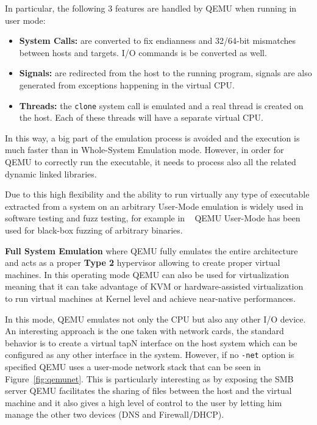 In particular, the following 3 features are handled by QEMU when running in user mode:

\begin{itemize}
    \item \textbf{System Calls:} are converted to fix endianness and 32/64-bit mismatches between hosts and targets. I/O commands is be converted as well.
    \item \textbf{Signals:} are redirected from the host to the running program, signals are also generated from exceptions happening in the virtual CPU.
    \item \textbf{Threads:} the \lstinline{clone} system call is emulated and a real thread is created on the host. Each of these threads will have a separate virtual CPU.
\end{itemize}

In this way, a big part of the emulation process is avoided and the execution is much faster than in Whole-System Emulation mode. However, in order for QEMU to correctly run the executable, it needs to process also all the related dynamic linked libraries. 

Due to this high flexibility and the ability to run virtually any type of executable extracted from a system on an arbitrary User-Mode emulation is widely used in software testing and fuzz testing, for example in ~\cite{QASan-SecDev20} QEMU User-Mode has been used for black-box fuzzing of arbitrary binaries.

\textbf{Full System Emulation} where QEMU fully emulates the entire architecture and acts as a proper \textbf{Type 2} hypervisor allowing to create proper virtual machines. In this operating mode QEMU can also be used for virtualization meaning that it can take advantage of KVM or hardware-assisted virtualization to run virtual machines at Kernel level and achieve near-native performances. 

In this mode, QEMU emulates not only the CPU but also any other I/O device. An interesting approach is the one taken with network cards, the standard behavior is to create a virtual tapN interface on the host system which can be configured as any other interface in the system. However, if no \lstinline{-net} option is specified QEMU uses a user-mode network stack that can be seen in Figure~\ref{fig:qemunet}. This is particularly interesting as by exposing the SMB server QEMU facilitates the sharing of files between the host and the virtual machine and it also gives a high level of control to the user by letting him manage the other two devices (DNS and Firewall/DHCP).

